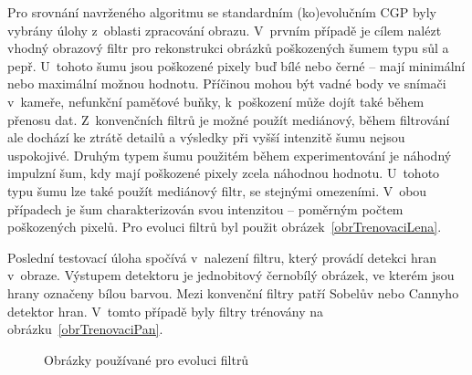 Pro srovnání navrženého algoritmu se standardním (ko)evolučním CGP byly vybrány úlohy z~oblasti zpracování obrazu. V~prvním případě je cílem nalézt vhodný obrazový filtr pro rekonstrukci obrázků poškozených šumem typu sůl a pepř. U~tohoto šumu jsou poškozené pixely buď bílé nebo černé -- mají minimální nebo maximální možnou hodnotu. Příčinou mohou být vadné body ve snímači v~kameře, nefunkční paměťové buňky, k~poškození může dojít také během přenosu dat. Z~konvenčních filtrů je možné použít mediánový, během filtrování ale dochází ke ztrátě detailů a výsledky při vyšší intenzitě šumu nejsou uspokojivé. Druhým typem šumu použitém během experimentování je náhodný impulzní šum, kdy mají poškozené pixely zcela náhodnou hodnotu. U~tohoto typu šumu lze také použít mediánový filtr, se stejnými omezeními. V~obou případech je šum charakterizován svou intenzitou -- poměrným počtem poškozených pixelů. Pro evoluci filtrů byl použit obrázek~\ref{obrTrenovaciLena}.

Poslední testovací úloha spočívá v~nalezení filtru, který provádí detekci hran v~obraze. Výstupem detektoru je jednobitový černobílý obrázek, ve kterém jsou hrany označeny bílou barvou. Mezi konvenční filtry patří Sobelův nebo Cannyho detektor hran. V~tomto případě byly filtry trénovány na obrázku~\ref{obrTrenovaciPan}.

\begin{figure}[htb]
    \centering
    \hfill
    \caption{Obrázky používané pro evoluci filtrů}
    \label{obrTrenovaci}
\end{figure}

